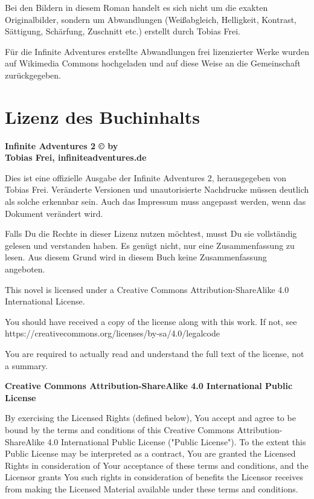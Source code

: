 Bei den Bildern in diesem Roman handelt es sich nicht um die exakten Originalbilder, sondern um Abwandlungen (Weißabgleich, Helligkeit, Kontrast, Sättigung, Schärfung, Zuschnitt etc.) erstellt durch Tobias Frei.

Für die Infinite Adventures erstellte Abwandlungen frei lizenzierter Werke wurden auf Wikimedia Commons hochgeladen und auf diese Weise an die Gemeinschaft zurückgegeben.


\chapter{Lizenz des Buchinhalts}

\textbf{Infinite Adventures 2 © by\\ Tobias Frei, infiniteadventures.de}

Dies ist eine offizielle Ausgabe der Infinite Adventures 2, herausgegeben von Tobias Frei. Veränderte Versionen und unautorisierte Nachdrucke müssen deutlich als solche erkennbar sein. Auch das Impressum muss angepasst werden, wenn das Dokument verändert wird.

Falls Du die Rechte in dieser Lizenz nutzen möchtest, musst Du sie vollständig gelesen und verstanden haben. Es genügt nicht, nur eine Zusammenfassung zu lesen. Aus diesem Grund wird in diesem Buch keine Zusammenfassung angeboten.

This novel is licensed under a Creative Commons Attribution-ShareAlike 4.0 International License.

You should have received a copy of the license along with this work. If not, see\\
https://creativecommons.org/licenses/by-sa/4.0/legalcode

You are required to actually read and understand the full text of the license, not a summary.

\begin{center}
    \large{\textbf{Creative Commons Attribution-ShareAlike 4.0 International Public License}}
\end{center}

By exercising the Licensed Rights (defined below), You accept and agree to be bound by the terms and conditions of this Creative Commons Attribution-ShareAlike 4.0 International Public License ("Public License"). To the extent this Public License may be interpreted as a contract, You are granted the Licensed Rights in consideration of Your acceptance of these terms and conditions, and the Licensor grants You such rights in consideration of benefits the Licensor receives from making the Licensed Material available under these terms and conditions.

